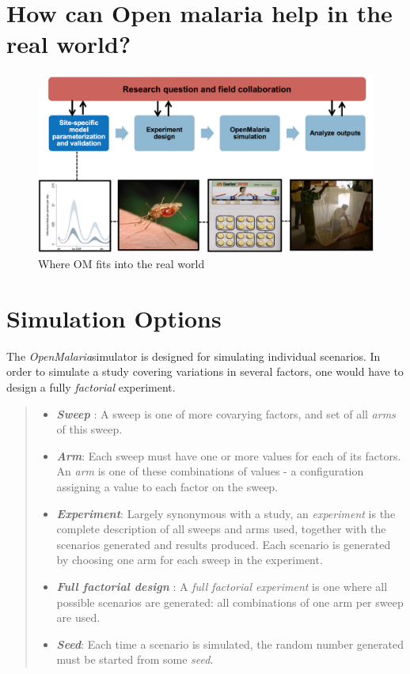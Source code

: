 \documentclass[]{scrartcl}
\newcommand{\om}{\textit{OpenMalaria}}
\begin{document}
\section{How can Open malaria help in the real world?}
\begin{figure}[h!]
\includegraphics[width=\textwidth]{images/research_process.png}
\caption{Where OM fits into the real world}
\end{figure}
\section{Simulation Options}

The \om simulator is designed for simulating individual scenarios. 
In order to simulate a study covering variations in several factors, one 
would have to  design a fully \textit{factorial} experiment.

\begin{quote}
	\begin{itemize}
		\item \textbf{\textit{Sweep}} : A sweep is one of more covarying factors, and set of all \textit{arms} of this sweep.
		\item \textbf{\textit{Arm}}: Each sweep must have one or more values for each of its factors. An \textit{arm} 
		is one of these combinations of values - a configuration assigning a value to each factor on the sweep. 
		\item \textbf{\textit{Experiment}}: Largely synonymous with a study, an \textit{experiment} is the complete
		description of all sweeps and arms used, together with the scenarios generated and results produced. Each scenario is generated by choosing
		one arm for each sweep in the experiment. 
		\item \textbf{\textit{Full factorial design}} : A \textit{full factorial experiment} is one where all possible scenarios are generated: all
		combinations of one arm per sweep are used.
		\item \textbf{\textit{Seed}}: Each time a scenario is simulated, the random number generated must be started from some \textit{seed}.
	\end{itemize}
\end{quote}
\end{document}
